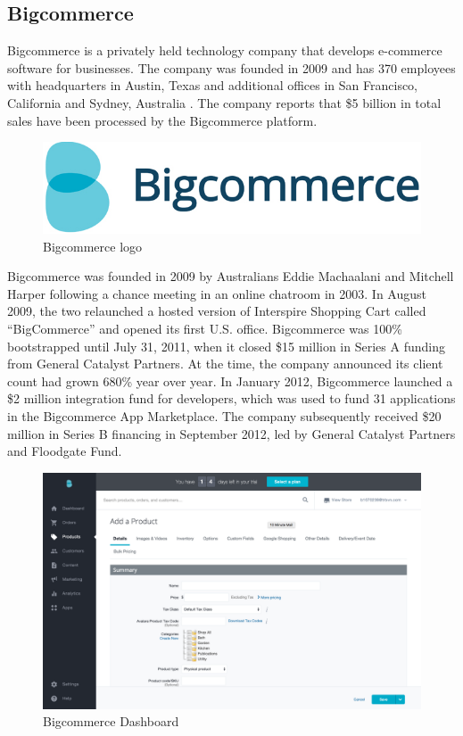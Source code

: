 \subsection{Bigcommerce}
Bigcommerce is a privately held technology company that develops e-commerce software for businesses. The company was founded in 2009 and has 370 employees with headquarters in Austin, Texas and additional offices in San Francisco, California and Sydney, Australia \cite{bigcommerce_overview}.
The company reports that \$5 billion in total sales have been processed by the Bigcommerce platform.
\begin{figure}[htb]
  \centering
  \includegraphics[width=0.5\linewidth]{images/chapter1/bigcommerce_logo.png}\hfill
  \caption[Bigcommerce logo]{Bigcommerce logo}
  \label{fig:ebay_logo}
\end{figure}
Bigcommerce was founded in 2009 by Australians Eddie Machaalani and Mitchell Harper following a chance meeting in an online chatroom in 2003. In August 2009, the two relaunched a hosted version of Interspire Shopping Cart called “BigCommerce” and opened its first U.S. office.
\newline
Bigcommerce was 100\% bootstrapped until July 31, 2011, when it closed \$15 million in Series A funding from General Catalyst Partners. At the time, the company announced its client count had grown 680\% year over year. In January 2012, Bigcommerce launched a \$2 million integration fund for developers, which was used to fund 31 applications in the Bigcommerce App Marketplace. The company subsequently received \$20 million in Series B financing in September 2012, led by General Catalyst Partners and Floodgate Fund.
\begin{figure}[htb]
 \centering
 \includegraphics[width=1.0\linewidth]{images/chapter1/ex-bigcommerce.png}\hfill
 \caption[Bigcommerce Dashboard]{Bigcommerce Dashboard}
 \label{fig:shopify_dashboard}
\end{figure}
